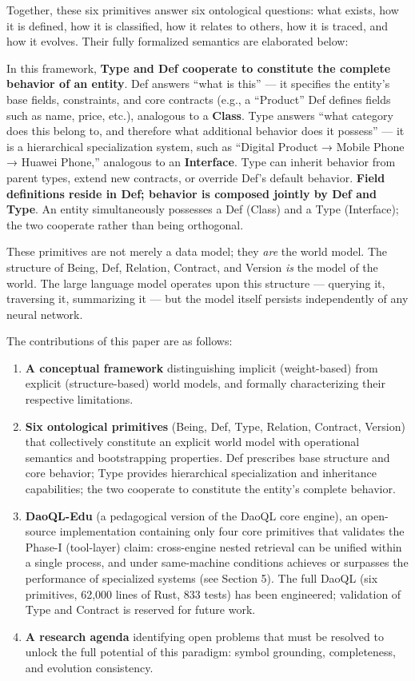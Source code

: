 \documentclass[11pt,a4paper]{article}
\begin{document}
Together, these six primitives answer six ontological questions: what
exists, how it is defined, how it is classified, how it relates to
others, how it is traced, and how it evolves. Their fully formalized
semantics are elaborated below:

In this framework, \textbf{Type and Def cooperate to constitute the
complete behavior of an entity}. Def answers ``what is this'' --- it
specifies the entity's base fields, constraints, and core contracts
(e.g., a ``Product'' Def defines fields such as name, price, etc.),
analogous to a \textbf{Class}. Type answers ``what category does this
belong to, and therefore what additional behavior does it possess'' ---
it is a hierarchical specialization system, such as ``Digital Product →
Mobile Phone → Huawei Phone,'' analogous to an \textbf{Interface}. Type
can inherit behavior from parent types, extend new contracts, or
override Def's default behavior. \textbf{Field definitions reside in
Def; behavior is composed jointly by Def and Type}. An entity
simultaneously possesses a Def (Class) and a Type (Interface); the two
cooperate rather than being orthogonal.

These primitives are not merely a data model; they \emph{are} the world
model. The structure of Being, Def, Relation, Contract, and Version
\emph{is} the model of the world. The large language model operates upon
this structure --- querying it, traversing it, summarizing it --- but
the model itself persists independently of any neural network.

The contributions of this paper are as follows:

\begin{enumerate}
\def\labelenumi{\arabic{enumi}.}
\item
  \textbf{A conceptual framework} distinguishing implicit (weight-based)
  from explicit (structure-based) world models, and formally
  characterizing their respective limitations.
\item
  \textbf{Six ontological primitives} (Being, Def, Type, Relation,
  Contract, Version) that collectively constitute an explicit world
  model with operational semantics and bootstrapping properties. Def
  prescribes base structure and core behavior; Type provides
  hierarchical specialization and inheritance capabilities; the two
  cooperate to constitute the entity's complete behavior.
\item
  \textbf{DaoQL-Edu} (a pedagogical version of the DaoQL core engine),
  an open-source implementation containing only four core primitives
  that validates the Phase-I (tool-layer) claim: cross-engine nested
  retrieval can be unified within a single process, and under
  same-machine conditions achieves or surpasses the performance of
  specialized systems (see Section 5). The full DaoQL (six primitives,
  62,000 lines of Rust, 833 tests) has been engineered; validation of
  Type and Contract is reserved for future work.
\item
  \textbf{A research agenda} identifying open problems that must be
  resolved to unlock the full potential of this paradigm: symbol
  grounding, completeness, and evolution consistency.
\end{enumerate}
\end{document}
